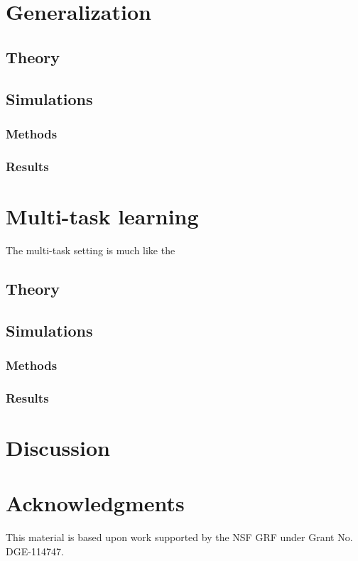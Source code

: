 \documentclass{article}
\begin{document}
\section{Generalization}

\subsection{Theory}
\subsection{Simulations}
\subsubsection{Methods}
\subsubsection{Results}

\section{Multi-task learning}
The multi-task setting is much like the 

\subsection{Theory}
\subsection{Simulations}
\subsubsection{Methods}
\subsubsection{Results}

\section{Discussion}

\section{Acknowledgments}
This material is based upon work supported by the NSF GRF under Grant No. DGE-114747.



\end{document}
